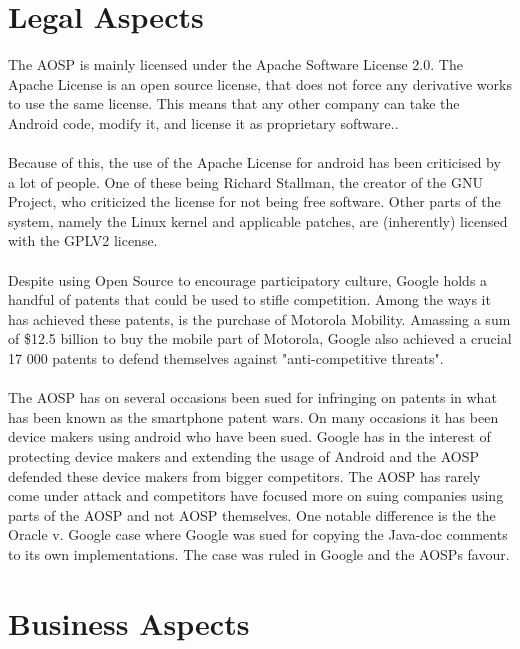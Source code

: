 \documentclass[conference]{IEEEtran}
\begin{document}
\section{Legal Aspects}
\label{legal}


The AOSP is mainly licensed under the Apache Software License 2.0. The Apache License is an open source license, that does not force any derivative works to use the same license. This means that any other company can take the Android code, modify it, and license it as proprietary software.\cite{apache-license}. 
\\\\Because of this, the use of the Apache License for android has been criticised by a lot of people. One of these being Richard Stallman, the creator of the GNU Project, who criticized the license for not being free software.\cite{rms-android} Other parts of the system, namely the Linux kernel and applicable patches, are (inherently) licensed with the GPLV2 license.\cite{gplv2}\cite{android-licenses} 
\\\\Despite using Open Source to encourage participatory culture, Google holds a handful of patents that could be used to stifle competition.\cite{google-slide-unlock}\cite{google-radial-menu} Among the ways it has achieved these patents, is the purchase of Motorola Mobility. Amassing a sum of \$12.5 billion to buy the mobile part of Motorola, Google also achieved a crucial 17 000 patents to defend themselves against "anti-competitive threats".\cite{Goggin}
\\\\The AOSP has on several occasions been sued for infringing on patents in what has been known as the smartphone patent wars. On many occasions it has been device makers using android who have been sued.\cite{android-vApple} Google has in the interest of protecting device makers and extending the usage of Android and the AOSP defended these device makers from bigger competitors.\cite{google-helps} The AOSP has rarely come under attack and competitors have focused more on suing companies using parts of the AOSP and not AOSP themselves. One notable difference is the the Oracle v. Google case where Google was sued for copying the Java-doc comments to its own implementations.\cite{android-v-oracle} The case was ruled in Google and the AOSPs favour.


\section{Business Aspects}
\label{financial}
\end{document}
